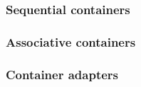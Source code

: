 


\subsubsection{Sequential containers}


\subsubsection{Associative containers}


\subsubsection{Container adapters}